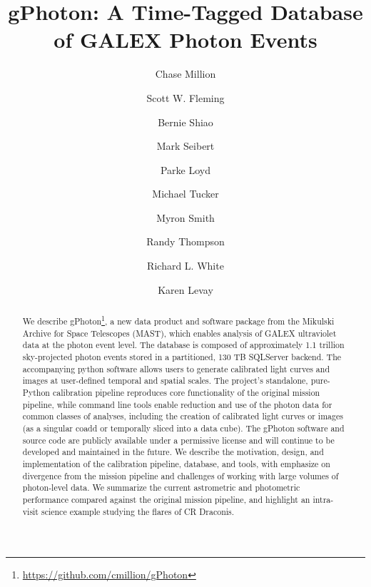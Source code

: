 \documentclass[5p]{elsarticle}
\begin{document}
\begin{frontmatter}
\title{gPhoton: A Time-Tagged Database of GALEX Photon Events}

\author[millionconcepts]{Chase Million}

\author[stsci,csc]{Scott W. Fleming}
\author[stsci]{Bernie Shiao}
\author[carnegie]{Mark Seibert}
\author[ucolorado]{Parke Loyd}
\author[appstate]{Michael Tucker}
\author[stsci]{Myron Smith}
\author[stsci,csc]{Randy Thompson}
\author[stsci]{Richard L. White}
\author[stsci,csc]{Karen Levay}

\address[millionconcepts]{Million Concepts LLC, 2204 Mountain View Ave., State College, PA 16801, USA}
\address[stsci]{Space Telescope Science Institute, 3700 San Martin Dr, Baltimore, MD 21218, USA}
\address[csc]{Computer Sciences Corporation, 3700 San Martin Dr, Baltimore, MD 21218, USA}
\address[carnegie]{The Observatories of the Carnegie Institution of Washington, 813 Santa Barbara Street, Pasadena, CA 91101, USA}
\address[ucolorado]{Department of Astrophysics and Planetary Science, University of Colorado, Boulder CO}
\address[appstate]{Dept. of Physics and Astronomy, Appalachian State University, Boone, NC 28608, USA}

\addtocounter{footnote}{1}

\begin{abstract}
We describe gPhoton\footnote{\url{https://github.com/cmillion/gPhoton}}, a new data product and software package from the Mikulski Archive for Space Telescopes (MAST), which enables analysis of GALEX ultraviolet data at the photon event level.  The database is composed of approximately 1.1 trillion sky-projected photon events stored in a partitioned, 130 TB SQLServer backend.  The accompanying python software allows users to generate calibrated light curves and images at user-defined temporal and spatial scales. The project's standalone, pure-Python calibration pipeline reproduces core functionality of the original mission pipeline, while command line tools enable reduction and use of the photon data for common classes of analyses, including the creation of calibrated light curves or images (as a singular coadd or temporally sliced into a data cube). The gPhoton software and source code are publicly available under a permissive license and will continue to be developed and maintained in the future. We describe the motivation, design, and implementation of the calibration pipeline, database, and tools, with emphasize on divergence from the mission pipeline and challenges of working with large volumes of photon-level data.  We summarize the current astrometric and photometric performance compared against the original mission pipeline, and highlight an intra-visit science example studying the flares of CR Draconis.
\end{abstract}

\end{frontmatter}
\end{document}
